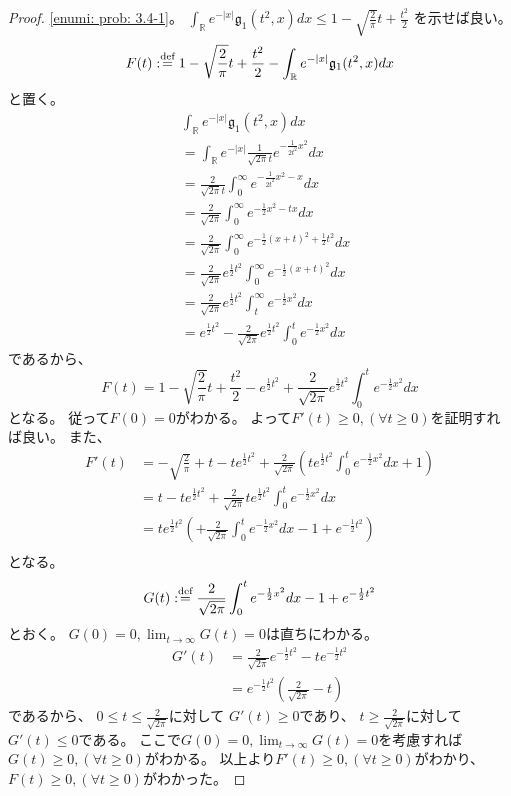 \documentclass[uplatex]{jsarticle}
\theoremstyle{definition}
\def\R{\mathbb{R}}
\def\dfn{:\overset{\mbox{{\scriptsize def}}}{=}}
\begin{document}
\begin{proof}
  \ref{enumi: prob: 3.4-1}。
  \(\int_{\R}e^{-|x|}\mathfrak{g}_1(t^2,x)dx
  \leq 1-\sqrt{\frac{2}{\pi}}t + \frac{t^2}{2}\)
  を示せば良い。
  \[
  F(t) \dfn 1-\sqrt{\frac{2}{\pi}}t + \frac{t^2}{2}
  - \int_{\R}e^{-|x|}\mathfrak{g}_1(t^2,x)dx
  \]
  と置く。
  \begin{align*}
    &\int_{\R}e^{-|x|}\mathfrak{g}_1(t^2,x)dx \\
    &= \int_{\R}e^{-|x|}\frac{1}{\sqrt{2\pi}t}e^{-\frac{1}{2t^2}x^2}dx \\
    &= \frac{2}{\sqrt{2\pi}t}\int_0^\infty e^{-\frac{1}{2t^2}x^2-x}dx \\
    &= \frac{2}{\sqrt{2\pi}}\int_0^\infty e^{-\frac{1}{2}x^2-tx}dx \\
    &= \frac{2}{\sqrt{2\pi}}\int_0^\infty e^{-\frac{1}{2}(x+t)^2+\frac{1}{2}t^2}dx \\
    &= \frac{2}{\sqrt{2\pi}}e^{\frac{1}{2}t^2}
    \int_0^\infty e^{-\frac{1}{2}(x+t)^2}dx \\
    &= \frac{2}{\sqrt{2\pi}}e^{\frac{1}{2}t^2}
    \int_t^\infty e^{-\frac{1}{2}x^2}dx \\
    &= e^{\frac{1}{2}t^2} - \frac{2}{\sqrt{2\pi}}e^{\frac{1}{2}t^2}
    \int_0^t e^{-\frac{1}{2}x^2}dx
  \end{align*}
  であるから、
  \[
  F(t) = 1-\sqrt{\frac{2}{\pi}}t + \frac{t^2}{2} - e^{\frac{1}{2}t^2}
  + \frac{2}{\sqrt{2\pi}}e^{\frac{1}{2}t^2}\int_0^t e^{-\frac{1}{2}x^2}dx
  \]
  となる。
  従って\(F(0)=0\)がわかる。
  よって\(F'(t) \geq 0, (\forall t \geq 0)\)を証明すれば良い。
  また、
  \begin{align*}
    F'(t) &=
    -\sqrt{\frac{2}{\pi}} + t - te^{\frac{1}{2}t^2}
    + \frac{2}{\sqrt{2\pi}}\left(
    te^{\frac{1}{2}t^2}\int_0^t e^{-\frac{1}{2}x^2}dx + 1 \right) \\
    &= t - te^{\frac{1}{2}t^2}
    + \frac{2}{\sqrt{2\pi}}te^{\frac{1}{2}t^2}\int_0^t e^{-\frac{1}{2}x^2}dx \\
    &= te^{\frac{1}{2}t^2}\left(
    + \frac{2}{\sqrt{2\pi}}\int_0^t e^{-\frac{1}{2}x^2}dx - 1
    + e^{-\frac{1}{2}t^2}\right) \\
  \end{align*}
  となる。
  \[
  G(t) \dfn
  \frac{2}{\sqrt{2\pi}}\int_0^t e^{-\frac{1}{2}x^2}dx - 1
  + e^{-\frac{1}{2}t^2}
  \]
  とおく。
  \(G(0) = 0, \lim_{t\to \infty}G(t) = 0\)は直ちにわかる。
  \begin{align*}
    G'(t) &= \frac{2}{\sqrt{2\pi}}e^{-\frac{1}{2}t^2} - te^{-\frac{1}{2}t^2} \\
    &= e^{-\frac{1}{2}t^2}\left(\frac{2}{\sqrt{2\pi}} - t\right)
  \end{align*}
  であるから、
  \(0\leq t \leq \frac{2}{\sqrt{2\pi}}\)に対して
  \(G'(t) \geq 0\)であり、
  \(t \geq \frac{2}{\sqrt{2\pi}}\)に対して
  \(G'(t) \leq 0\)である。
  ここで\(G(0)=0,\lim_{t\to \infty}G(t)=0\)を考慮すれば
  \(G(t) \geq 0 , ( \forall t \geq 0)\)がわかる。
  以上より\(F'(t) \geq 0, (\forall t \geq 0)\)がわかり、
  \(F(t) \geq 0, (\forall t \geq 0)\)がわかった。


\end{proof}
\end{document}
